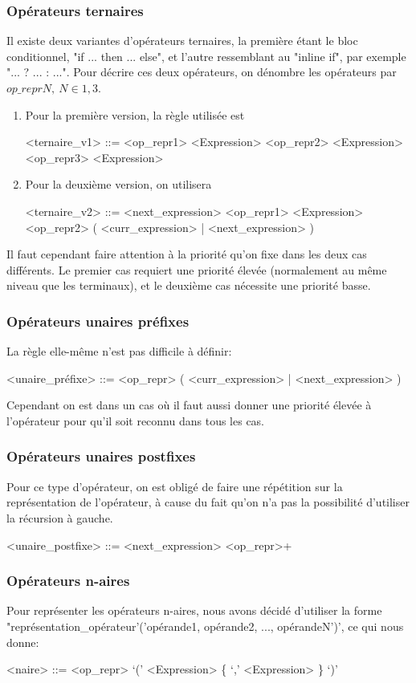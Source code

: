 \documentclass{article}
\begin{document}
\subsubsection{Opérateurs ternaires}
Il existe deux variantes d'opérateurs ternaires, la première étant le bloc conditionnel, "if ... then ... else", et l'autre ressemblant au "inline if", par exemple "... ? ... : ...". Pour décrire ces deux opérateurs, on dénombre les opérateurs par $op\_reprN, \ N \in {1, 3}$.
\begin{enumerate}
	\item Pour la première version, la règle utilisée est 
	\begin{grammar}
		<ternaire\_v1> ::= <op\_repr1> <Expression> <op\_repr2> <Expression> <op\_repr3> <Expression>
	\end{grammar}
	\item Pour la deuxième version, on utilisera
	\begin{grammar}
		<ternaire\_v2> ::= <next\_expression> <op\_repr1> <Expression> <op\_repr2> ( <curr\_expression> | <next\_expression> )
	\end{grammar}
\end{enumerate}
Il faut cependant faire attention à la priorité qu'on fixe dans les deux cas différents. Le premier cas requiert une priorité élevée (normalement au même niveau que les terminaux), et le deuxième cas nécessite une priorité basse.
\subsubsection{Opérateurs unaires préfixes}
La règle elle-même n'est pas difficile à définir:
\begin{grammar}
	<unaire\_préfixe> ::= <op\_repr> ( <curr\_expression> | <next\_expression> )
\end{grammar}
Cependant on est dans un cas où il faut aussi donner une priorité élevée à l'opérateur pour qu'il soit reconnu dans tous les cas.
\subsubsection{Opérateurs unaires postfixes}
Pour ce type d'opérateur, on est obligé de faire une répétition sur la représentation de l'opérateur, à cause du fait qu'on n'a pas la possibilité d'utiliser la récursion à gauche.
\begin{grammar}
	<unaire\_postfixe> ::= <next\_expression> <op\_repr>+
\end{grammar}
\subsubsection{Opérateurs n-aires}
Pour représenter les opérateurs n-aires, nous avons décidé d'utiliser la forme "représentation\_opérateur'('opérande1, opérande2, ..., opérandeN')', ce qui nous donne:
\begin{grammar}
	<naire> ::= <op\_repr> `(' <Expression> \{ `,' <Expression> \} `)'
\end{grammar}
\end{document}
